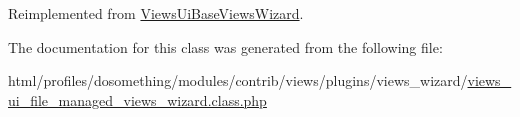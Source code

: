 Reimplemented from \hyperlink{classViewsUiBaseViewsWizard_a862c9e72a5e11fd78baa1992581f1410}{ViewsUiBaseViewsWizard}.

The documentation for this class was generated from the following file:\begin{DoxyCompactItemize}
\item 
html/profiles/dosomething/modules/contrib/views/plugins/views\_\-wizard/\hyperlink{views__ui__file__managed__views__wizard_8class_8php}{views\_\-ui\_\-file\_\-managed\_\-views\_\-wizard.class.php}\end{DoxyCompactItemize}
